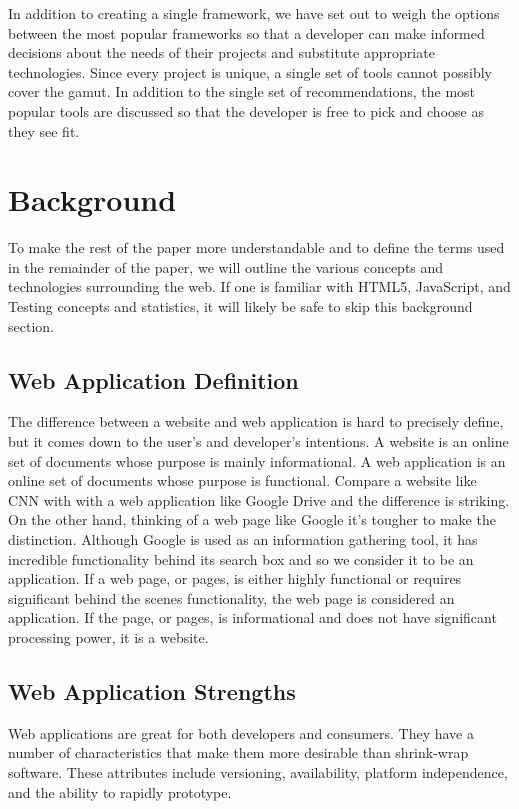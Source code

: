 \documentclass[12pt]{ucthesis}
\begin{document}
In addition to creating a single framework, we have set out to weigh the options between the most popular frameworks so that a developer can make informed decisions about the needs of their projects and substitute appropriate technologies. Since every project is unique, a single set of tools cannot possibly cover the gamut. In addition to the single set of recommendations, the most popular tools are discussed so that the developer is free to pick and choose as they see fit.

\chapter{Background}
To make the rest of the paper more understandable and to define the terms used in the remainder of the paper, we will outline the various concepts and technologies surrounding the web.
If one is familiar with HTML5, JavaScript, and Testing concepts and statistics, it will likely be safe to skip this background section.

\section{Web Application Definition}
The difference between a website and web application is hard to precisely define, but it comes down to the user's and developer's intentions. A website is an online set of documents whose purpose is mainly informational. A web application is an online set of documents whose purpose is functional. Compare a website like CNN with with a web application like Google Drive and the difference is striking. On the other hand, thinking of a web page like Google it's tougher to make the distinction. Although Google is used as an information gathering tool, it has incredible functionality behind its search box and so we consider it to be an application. If a web page, or pages, is either highly functional or requires significant behind the scenes functionality, the web page is considered an application. If the page, or pages, is informational and does not have significant processing power, it is a website.

\section{Web Application Strengths}
Web applications are great for both developers and consumers. They have a number of characteristics that make them more desirable than shrink-wrap software. These attributes include versioning, availability, platform independence, and the ability to rapidly prototype.
\end{document}
